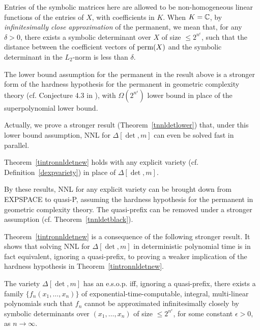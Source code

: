 \documentclass[11pt]{article}
\begin{document}
Entries of the symbolic matrices here are allowed to be non-homogeneous linear functions of the entries of $X$, with coefficients in $K$.
When $K=\mathbb{C}$, by {\em infinitesimally close approximation} of the permanent, we mean that, for any $\delta >0$, 
there exists a symbolic determinant over $X$  of  size $\le 2^{n^\epsilon}$, 
such that the distance  between the coefficient vectors of ${\mbox {perm}}(X)$ and the symbolic determinant 
in the $L_2$-norm  is less than $\delta$.

The lower bound assumption for  the permanent in the result above  is 
a stronger form of the hardness hypothesis for the permanent in geometric complexity theory 
(cf. Conjecture 4.3 in \cite{GCT1}), with $\Omega(2^{n^\epsilon})$ lower bound in place of
the superpolynomial lower bound. 

Actually, we prove a stronger result (Theorem~\ref{tnnldetlower}) that, under this 
lower bound assumption,  NNL for $\Delta[\det,m]$  can even
be solved  fast in parallel.

\begin{theorem}\label{tintronnlexplicitnew}
Theorem~\ref{tintronnldetnew}  holds with   any explicit variety (cf. Definition~\ref{dexpvariety}) in place of $\Delta[\det,m]$.
\end{theorem}

By these results, NNL for  any explicit variety can be brought down from
EXPSPACE to quasi-P, assuming the hardness hypothesis \cite{GCT1} for the permanent in geometric complexity theory.
The quasi-prefix can be removed under a stronger assumption (cf. Theorem~\ref{tnnldetblack}).

Theorem~\ref{tintronnldetnew} is a consequence of the following stronger  result.
It shows that solving NNL for $\Delta[\det,m]$  in deterministic polynomial time is in fact
equivalent, ignoring a quasi-prefix,   to proving a weaker implication of the 
hardness hypothesis in Theorem~\ref{tintronnldetnew}.

\begin{theorem}  \label{tequivnnlnew} 
The variety   $\Delta[\det,m]$ has an e.s.o.p. iff, 
ignoring a quasi-prefix, there exists a family $\{f_n(x_1,\ldots,x_n)\}$ of 
exponential-time-computable, integral, multi-linear polynomials such that $f_n$ cannot be 
approximated infinitesimally closely  by symbolic determinants over $(x_1,\ldots,x_n)$
of  size $\le 2^{n^\epsilon}$, for some constant $\epsilon >0$, as $n \rightarrow \infty$.
\end{theorem}
\end{document}
